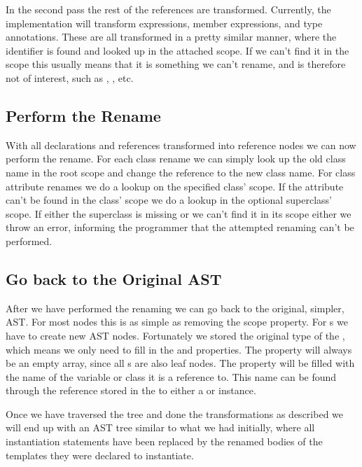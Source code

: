 In the second pass the rest of the references are transformed.
Currently, the implementation will transform  expressions, member expressions, and type annotations.
These are all transformed in a pretty similar manner, where the identifier is found and looked up in the attached scope.
If we can't find it in the scope this usually means that it is something we can't rename, and is therefore not of interest, such as , , etc.

\subsection{Perform the Rename}\label{subsec:performing-the-rename}

With all declarations and references transformed into reference nodes we can now perform the rename.
For each class rename we can simply look up the old class name in the root scope and change the reference to the new class name.
For class attribute renames we do a lookup on the specified class' scope.
If the attribute can't be found in the class' scope we do a lookup in the optional superclass' scope.
If either the superclass is missing or we can't find it in its scope either we throw an error, informing the programmer that the attempted renaming can't be performed.

\subsection{Go back to the Original AST}\label{subsec:going-back-to-the-original-ast}

After we have performed the renaming we can go back to the original, simpler, AST\@.
For most nodes this is as simple as removing the scope property.
For s we have to create new AST nodes.
Fortunately we stored the original type of the , which means we only need to fill in the  and  properties.
The  property will always be an empty array, since all s are also leaf nodes.
The  property will be filled with the name of the variable or class it is a reference to.
This name can be found through the reference stored in the  to either a  or  instance.

Once we have traversed the tree and done the transformations as described we will end up with an AST tree similar to what we had initially, where all instantiation statements have been replaced by the renamed bodies of the templates they were declared to instantiate.

